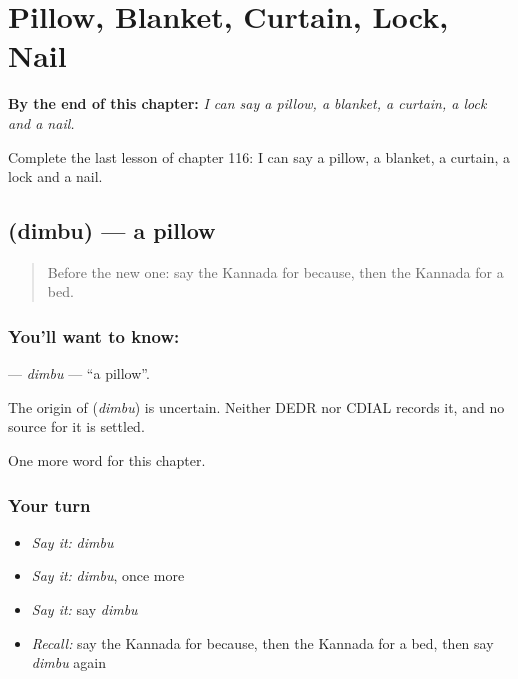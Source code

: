 
\chapter{Pillow, Blanket, Curtain, Lock, Nail}
\label{ch:ka-pillow-blanket-curtain-lock-nail}

\begin{chapteropening}
\textbf{By the end of this chapter:} \emph{I can say a pillow, a blanket, a curtain, a lock and a nail.}

Complete the last lesson of chapter 116: I can say a pillow, a blanket, a curtain, a lock and a nail.
\end{chapteropening}

\section[\texorpdfstring{\kn{ದಿಂಬು} (dimbu)}{ದಿಂಬು (dimbu)}]{ (dimbu) — a pillow}

\label{lesson:KA-C116-dimbu}



\begin{quote}
Before the new one: say the Kannada for because, then the Kannada for a bed.
\end{quote}

\subsection*{You'll want to know: }
\textbf{} — \emph{dimbu} — \textquotedblleft{}a pillow\textquotedblright{}.

\begin{cousinweb}
The origin of \textbf{} (\emph{dimbu}) is uncertain. Neither DEDR nor CDIAL records it, and no source for it is settled.
\end{cousinweb}

\begin{grammarlens}[title={What you've built}]
One more word for this chapter.
\end{grammarlens}

\subsection*{Your turn}
\begin{itemize}
\raggedright
  \item \emph{Say it:} \emph{dimbu}
  \item \emph{Say it:} \emph{dimbu}, once more
  \item \emph{Say it:} say \emph{dimbu}
  \item \emph{Recall:} say the Kannada for because, then the Kannada for a bed, then say \emph{dimbu} again
\end{itemize}

